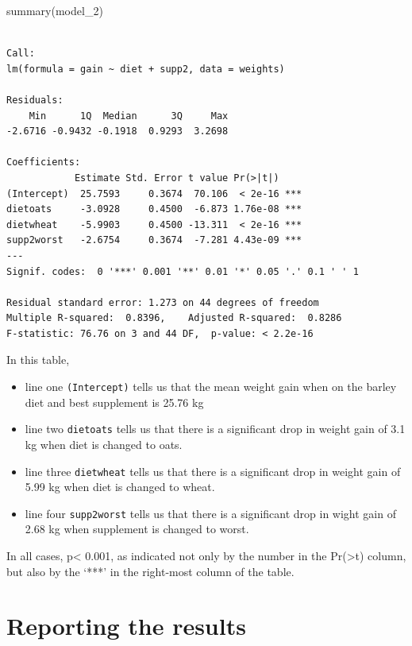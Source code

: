 \documentclass[
  letterpaper,
  DIV=11,
  numbers=noendperiod]{scrreprt}
\newenvironment{Shaded}{\begin{snugshade}}{\end{snugshade}}
\newcommand{\FunctionTok}[1]{\textcolor[rgb]{0.28,0.35,0.67}{#1}}
\newcommand{\NormalTok}[1]{\textcolor[rgb]{0.00,0.23,0.31}{#1}}
\providecommand{\tightlist}{%
  \setlength{\itemsep}{0pt}\setlength{\parskip}{0pt}}\usepackage{longtable,booktabs,array}
\begin{document}
\begin{Shaded}
\begin{Highlighting}[]
\FunctionTok{summary}\NormalTok{(model\_2)}
\end{Highlighting}
\end{Shaded}

\begin{verbatim}

Call:
lm(formula = gain ~ diet + supp2, data = weights)

Residuals:
    Min      1Q  Median      3Q     Max 
-2.6716 -0.9432 -0.1918  0.9293  3.2698 

Coefficients:
            Estimate Std. Error t value Pr(>|t|)    
(Intercept)  25.7593     0.3674  70.106  < 2e-16 ***
dietoats     -3.0928     0.4500  -6.873 1.76e-08 ***
dietwheat    -5.9903     0.4500 -13.311  < 2e-16 ***
supp2worst   -2.6754     0.3674  -7.281 4.43e-09 ***
---
Signif. codes:  0 '***' 0.001 '**' 0.01 '*' 0.05 '.' 0.1 ' ' 1

Residual standard error: 1.273 on 44 degrees of freedom
Multiple R-squared:  0.8396,    Adjusted R-squared:  0.8286 
F-statistic: 76.76 on 3 and 44 DF,  p-value: < 2.2e-16
\end{verbatim}

In this table,

\begin{itemize}
\tightlist
\item
  line one \texttt{(Intercept)} tells us that the mean weight gain when
  on the barley diet and best supplement is 25.76 kg
\item
  line two \texttt{dietoats} tells us that there is a significant drop
  in weight gain of 3.1 kg when diet is changed to oats.
\item
  line three \texttt{dietwheat} tells us that there is a significant
  drop in weight gain of 5.99 kg when diet is changed to wheat.
\item
  line four \texttt{supp2worst} tells us that there is a significant
  drop in wight gain of 2.68 kg when supplement is changed to worst.
\end{itemize}

In all cases, p\textless{} 0.001, as indicated not only by the number in
the Pr(\textgreater\textbar t\textbar) column, but also by the `***' in
the right-most column of the table.

\section{Reporting the results}\label{reporting-the-results}
\end{document}
